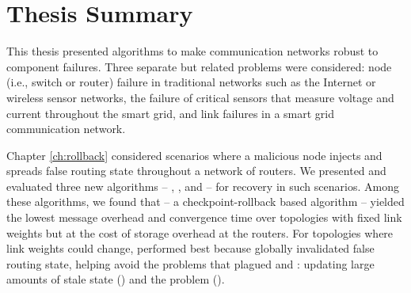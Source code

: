 \section{Thesis Summary}
\label{sec:thesis-summary}

This thesis presented algorithms to make communication networks robust to component failures. %
Three separate but related problems were considered: node (i.e., switch or router) failure in traditional networks such as the Internet or wireless sensor networks,
the failure of critical sensors that measure voltage and current throughout the smart grid, and link failures in a smart grid communication network.

Chapter \ref{ch:rollback} considered scenarios where a malicious node injects and spreads false routing state throughout a network of routers.
We presented and evaluated three new algorithms -- \seconds, \purges, and \cpr -- for recovery in such scenarios. %
Among these algorithms, we found that \cpr -- a checkpoint-rollback based algorithm -- yielded the lowest message overhead and convergence time over topologies
with fixed link weights but at the cost of storage overhead at the routers.
For topologies where link weights could change, \purge performed best because \purge globally invalidated false routing state, helping \purge avoid the problems that 
plagued \cpr and \seconds: updating large amounts of stale state (\cprs) and the \infinity problem (\seconds).


